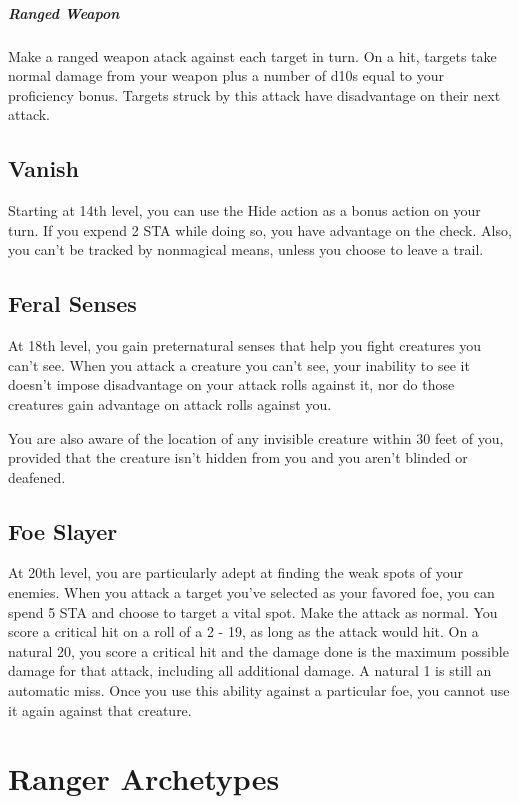 \subparagraph*{Ranged Weapon} Make a ranged weapon atack against each target in turn. On a hit, targets take normal damage from your weapon plus a number of d10s equal to your proficiency bonus. Targets struck by this attack have disadvantage on their next attack.

\subsection{Vanish}

Starting at 14th level, you can use the Hide action as a bonus action on your turn. If you expend 2 STA while doing so, you have advantage on the check. Also, you can't be tracked by nonmagical means, unless you choose to leave a trail.

\subsection{Feral Senses}

At 18th level, you gain preternatural senses that help you fight creatures you can't see. When you attack a creature you can't see, your inability to see it doesn't impose disadvantage on your attack rolls against it, nor do those creatures gain advantage on attack rolls against you.

You are also aware of the location of any invisible creature within 30 feet of you, provided that the creature isn't hidden from you and you aren't blinded or deafened.

\subsection{Foe Slayer}
At 20th level, you are particularly adept at finding the weak spots of your enemies. When you attack a target you've selected as your favored foe, you can spend 5 STA and choose to target a vital spot. Make the attack as normal. You score a critical hit on a roll of a 2 - 19, as long as the attack would hit. On a natural 20, you score a critical hit and the damage done is the maximum possible damage for that attack, including all additional damage. A natural 1 is still an automatic miss. Once you use this ability against a particular foe, you cannot use it again against that creature.

\section{Ranger Archetypes}


